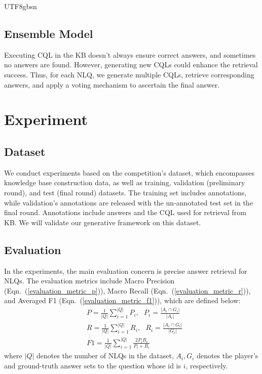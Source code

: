 \documentclass[runningheads]{llncs}
\begin{document}
\begin{CJK*}{UTF8}{gbsn}
\subsection{Ensemble Model}

Executing CQL in the KB doesn't always ensure correct answers, and sometimes no answers are found. 
However, generating new CQLs could enhance the retrieval success. 
Thus, for each NLQ, we generate multiple CQLs, retrieve corresponding answers, and apply a voting mechanism to ascertain the final answer.


\section{Experiment}

\subsection{Dataset}

We conduct experiments based on the competition's dataset, which encompasses knowledge base construction data, as well as training, validation (preliminary round), and test (final round) datasets. 
The training set includes annotations, while validation's annotations are released with the un-annotated test set in the final round. 
Annotations include answers and the CQL used for retrieval from KB. We will validate our generative framework on this dataset.

\subsection{Evaluation}

In the experiments, the main evaluation concern is precise answer retrieval for NLQs.
The evaluation metrics include Macro Precision (Eqn.~(\ref{evaluation_metric_p})), Macro Recall (Eqn.~(\ref{evaluation_metric_r})), and Averaged F1 (Eqn.~(\ref{evaluation_metric_f1})), which are defined below: 
\begin{align}
    \label{evaluation_metric_p}
    &P = \frac{1}{|Q|} \sum_{i=1}^{|Q|} P_i, ~~~P_i = \frac{|A_i \cap G_i|}{|A_i|} \\
    \label{evaluation_metric_r}
    &R = \frac{1}{|Q|} \sum_{i=1}^{|Q|} R_i, ~~~R_i = \frac{|A_i \cap G_i|}{|G_i|} \\
    \label{evaluation_metric_f1}
    &F1 = \frac{1}{|Q|} \sum_{i=1}^{|Q|} \frac{2 P_i R_i}{P_i + R_i}
\end{align}
where $|Q|$ denotes the number of NLQs in the dataset, $A_i, G_i$ denotes the player's and ground-truth answer sets to the question whose id is $i$, respectively.


\end{CJK*}
\end{document}
